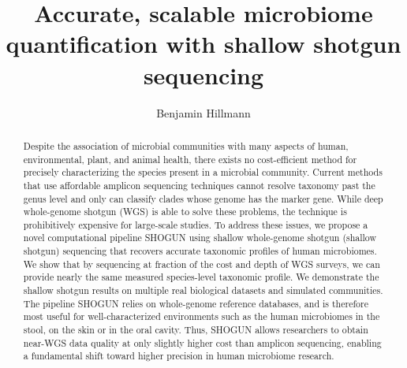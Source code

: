 \documentclass[manuscript, screen, review=True]{acmart}
\begin{document}
\title{Accurate, scalable microbiome quantification with shallow shotgun sequencing}

\author{Benjamin Hillmann}


\renewcommand{\shortauthors}{Benjamin Hillmann}

\begin{abstract}
Despite the association of microbial communities with many aspects of human, environmental, plant, and animal health, there exists no cost-efficient method for precisely characterizing the species present in a microbial community. Current methods that use affordable amplicon sequencing techniques cannot resolve taxonomy past the genus level and only can classify clades whose genome has the marker gene. While deep whole-genome shotgun (WGS) is able to solve these problems, the technique is prohibitively expensive for large-scale studies. To address these issues, we propose a novel computational pipeline SHOGUN using shallow whole-genome shotgun (shallow shotgun) sequencing that recovers accurate taxonomic profiles of human microbiomes. We show that by sequencing at fraction of the cost and depth of WGS surveys, we can provide nearly the same measured species-level taxonomic profile. We demonstrate the shallow shotgun results on multiple real biological datasets and simulated communities. The pipeline SHOGUN relies on whole-genome reference databases, and is therefore most useful for well-characterized environments such as the human microbiomes in the stool, on the skin or in the oral cavity. Thus, SHOGUN allows researchers to obtain near-WGS data quality at only slightly higher cost than amplicon sequencing, enabling a fundamental shift toward higher precision in human microbiome research.
\end{abstract}

%
%





\maketitle




\newpage



\newpage




\newpage


\end{document}
